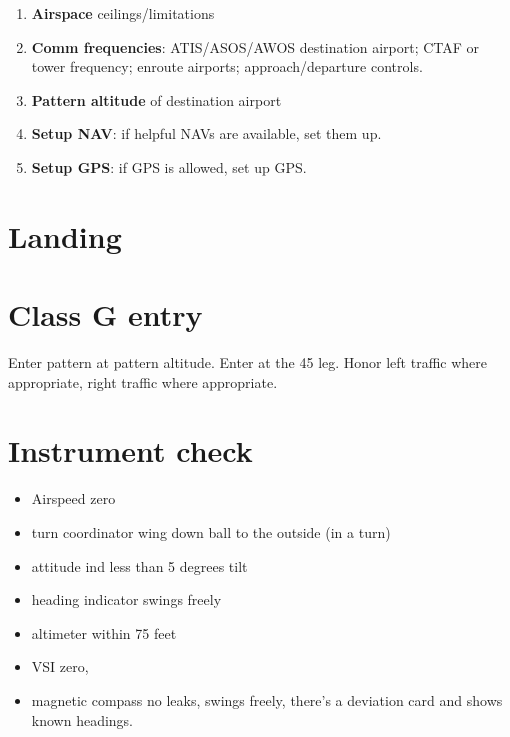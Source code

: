\documentclass[article,9pt,landscape]{memoir}
\begin{document}
\begin{multicols*}{4}
\begin{enumerate}
    \item \textbf{Airspace} ceilings/limitations

    \item \textbf{Comm frequencies}: ATIS/ASOS/AWOS destination
      airport; CTAF or tower frequency; enroute airports;
      approach/departure controls.

    \item \textbf{Pattern altitude} of destination airport

    \item \textbf{Setup NAV}: if helpful NAVs are available, set them up.

    \item \textbf{Setup GPS}: if GPS is allowed, set up GPS.
  \end{enumerate}
  \chapter{Landing}
  \chapter{Class G entry}
  Enter pattern at pattern altitude.  Enter at the 45 leg.  Honor left traffic
  where appropriate, right traffic where appropriate.

  \chapter{Instrument check}

  \begin{itemize}
    \item Airspeed zero

    \item turn coordinator wing down ball to the outside (in a turn)

    \item attitude ind less than 5 degrees tilt

    \item heading indicator swings freely

    \item altimeter within 75 feet

    \item VSI zero, 

    \item magnetic compass no leaks, swings freely, there's a
      deviation card and shows known headings.
  \end{itemize}


\end{multicols*}
\end{document}
